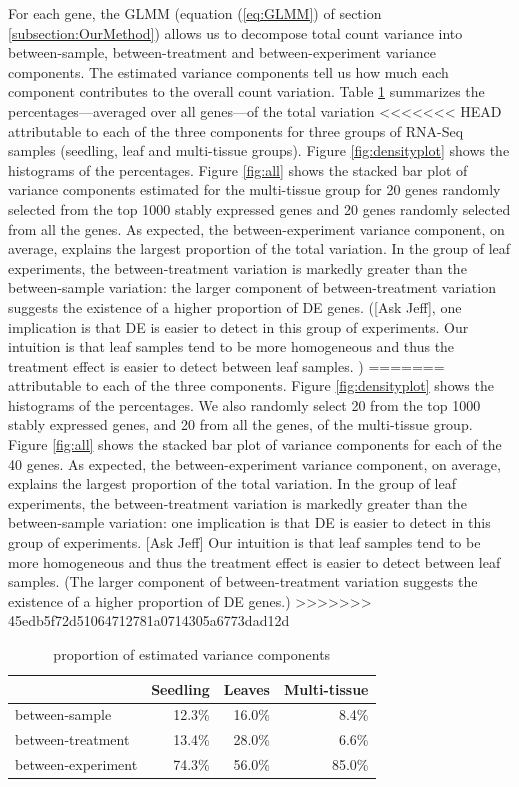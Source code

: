 \documentclass[11pt, a4paper]{article}
\begin{document}
For each gene, the GLMM (equation (\ref{eq:GLMM}) of section
\ref{subsection:OurMethod}) allows us to decompose total count variance into
between-sample, between-treatment and between-experiment variance components.
The estimated variance components tell us how much each component contributes
to the overall count variation. Table \ref{table:percentageofvariation}
summarizes the percentages---averaged over all genes---of the total variation
<<<<<<< HEAD
attributable to each of the three components for three groups of RNA-Seq
samples (seedling, leaf and multi-tissue groups).  Figure \ref{fig:densityplot}
shows the histograms of the percentages. 
Figure \ref{fig:all} shows the stacked bar plot of variance components 
estimated for the multi-tissue group for 20
genes randomly selected from the top 1000 stably expressed genes 
and 20 genes randomly selected from all the genes. 
As expected, the between-experiment variance component, on average, explains
the largest proportion of the total variation. In the group of leaf
experiments, the between-treatment variation is markedly greater than the
between-sample variation:
the larger component of between-treatment variation suggests the existence of a higher proportion of DE genes.
([Ask Jeff], one implication is that DE is easier to detect in
this group of experiments.  
 Our intuition is that leaf samples tend
to be more homogeneous and thus the treatment effect is easier to detect
between leaf samples. ) 
=======
attributable to each of the three components.  Figure \ref{fig:densityplot}
shows the histograms of the percentages. We also randomly select 20 from
the top 1000 stably expressed genes, and 20 from all the genes, of the
multi-tissue group. Figure \ref{fig:all} shows the stacked bar plot of
variance components for each of the 40 genes.  As expected, the
between-experiment variance component, on average, explains the largest
proportion of the total variation. In the group of leaf experiments, the
between-treatment variation is markedly greater than the between-sample
variation: one implication is that DE is easier to detect in this group of
experiments.  [Ask Jeff] Our intuition is that leaf samples tend to be more
homogeneous and thus the treatment effect is easier to detect between leaf
samples. (The larger component of between-treatment variation suggests the
existence of a higher proportion of DE genes.) 
>>>>>>> 45edb5f72d51064712781a0714305a6773dad12d
 
 \begin{center} \begin{table}[h!] \centering \caption{proportion of estimated
     variance components} \label{table:percentageofvariation}
     \begin{tabular}{lrrr}\hline & Seedling & Leaves & Multi-tissue \\  \hline
	 between-sample     & 12.3\%   & 16.0\% & 8.4\%           \\
	 between-treatment  & 13.4\%   & 28.0\% & 6.6\%           \\
	 between-experiment & 74.3\%   & 56.0\% & 85.0\%         \\ \hline
     \end{tabular} \end{table} \end{center}
\end{document}
